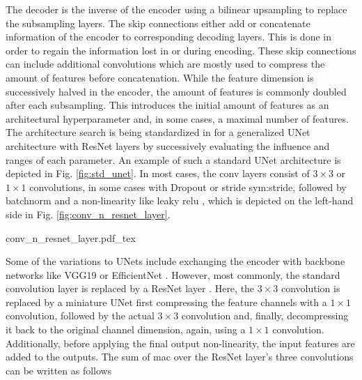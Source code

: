 The decoder is the inverse of the encoder using a bilinear upsampling \cite{odena2016deconvolution} to replace the subsampling layers. The skip connections either add or concatenate information of the encoder to corresponding decoding layers. This is done in order to regain the information lost in or during encoding. These skip connections can include additional convolutions which are mostly used to compress the amount of features before concatenation. While the feature dimension is successively halved in the encoder, the amount of features is commonly doubled after each subsampling. This introduces the initial amount of features as an architectural hyperparameter and, in some cases, a maximal number of features. The architecture search is being standardized in \cite{radosavovic2020designing} for a generalized UNet architecture with ResNet layers by successively evaluating the influence and ranges of each parameter. An example of such a standard UNet architecture is depicted in Fig. \ref{fig:std_unet}. In most cases, the \gls{conv} layers consist of $3 \times 3$ or $1 \times 1$ convolutions, in some cases with Dropout \cite{srivastava2014dropout} or stride \gls{sym:stride}, followed by \gls{batchnorm} \cite{ioffe2015batch} and a non-linearity like leaky \gls{relu} \cite{maas2013rectifier}, which is depicted on the left-hand side in Fig. \ref{fig:conv_n_resnet_layer}.
\begin{center}
	{conv_n_resnet_layer.pdf_tex}
\end{center}
Some of the variations to UNets include exchanging the encoder with backbone networks like VGG19 \cite{simonyan2014very,wulff2018early} or EfficientNet \cite{tan2019efficientnet,philion2020lift}. However, most commonly, the standard convolution layer is replaced by a ResNet layer \cite{he2016deep,wirges2018evidential,reiher2020sim2real,roddick2020predicting,philion2020lift}. Here, the $3 \times 3$ convolution is replaced by a miniature UNet first compressing the feature channels with a $1\times 1$ convolution, followed by the actual $3 \times 3$ convolution and, finally, decompressing it back to the original channel dimension, again, using a $1 \times 1$ convolution. Additionally, before applying the final output non-linearity, the input features are added to the outputs. The sum of \gls{mac} over the ResNet layer's three convolutions can be written as follows
